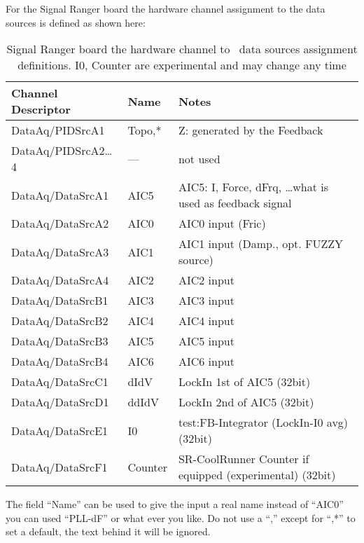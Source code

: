 For the Signal Ranger board the hardware channel assignment to the
\Gxsm data sources is defined as shown here:

\begin{table}[hbt]
\begin{tabular}{|l|l|l|}
\hline
Channel Descriptor& Name       & Notes\\\hline\hline
DataAq/PIDSrcA1   & Topo,*     & Z: generated by the Feedback\\
DataAq/PIDSrcA2\dots4 & ---    & not used\\\hline
DataAq/DataSrcA1  & AIC5       & AIC5: I, Force, dFrq, \dots what is used as feedback signal\\
DataAq/DataSrcA2  & AIC0       & AIC0 input (Fric)\\
DataAq/DataSrcA3  & AIC1       & AIC1 input (Damp., opt. FUZZY source)\\
DataAq/DataSrcA4  & AIC2       & AIC2 input\\\hline
DataAq/DataSrcB1  & AIC3       & AIC3 input\\
DataAq/DataSrcB2  & AIC4       & AIC4 input\\
DataAq/DataSrcB3  & AIC5       & AIC5 input\\
DataAq/DataSrcB4  & AIC6       & AIC6 input\\\hline
DataAq/DataSrcC1  & dIdV       & LockIn 1st of AIC5 (32bit)\\
DataAq/DataSrcD1  & ddIdV      & LockIn 2nd of AIC5 (32bit)\\\hline
DataAq/DataSrcE1  & I0         & test:FB-Integrator (LockIn-I0 avg) (32bit) \\\hline
DataAq/DataSrcF1  & Counter    & SR-CoolRunner Counter if equipped (experimental) (32bit)\\\hline
\end{tabular}
  \caption{Signal Ranger board the hardware channel to \Gxsm\ data sources assignment definitions. I0, Counter are experimental and may change any time}
  \label{tab:preferences:dataaq}
\end{table}


The field ``Name'' can be used to give the input a real name instead
of ``AIC0'' you can used ``PLL-dF'' or what ever you like. Do not use
a ``,'' except for ``,*'' to set a default, the text behind it will be ignored.

